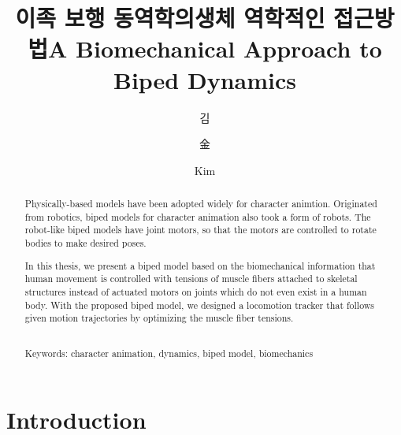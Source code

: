 \documentclass[master,english,final]{kaist-ucs}
\title[korean] {이족 보행 동역학의\linebreak 생체 역학적인 접근방법}
\title[english]{A Biomechanical Approach to Biped Dynamics}
\author[korean] {김}{거 엽}
\author[chinese]{金}{거 엽}
\author[english]{Kim}{Geo Yeob}
\begin{document}

\begin{abstract}
Physically-based models have been adopted widely for character animtion.
Originated from robotics, biped models for character animation
also took a form of robots. The robot-like biped models have joint motors,
so that the motors are controlled to rotate bodies to make desired poses.

In this thesis, we present a biped model based on the biomechanical information that
human movement is controlled with tensions of muscle fibers attached
to skeletal structures instead of actuated motors on joints which do not even exist in
a human body.
With the proposed biped model, we designed a locomotion tracker
that follows given motion trajectories by optimizing the muscle fiber tensions.


\noindent
\\Keywords: character animation, dynamics, biped model, biomechanics

\end{abstract}


\tableofcontents

\listoftables

\listoffigures


\chapter{Introduction}
\end{document}

